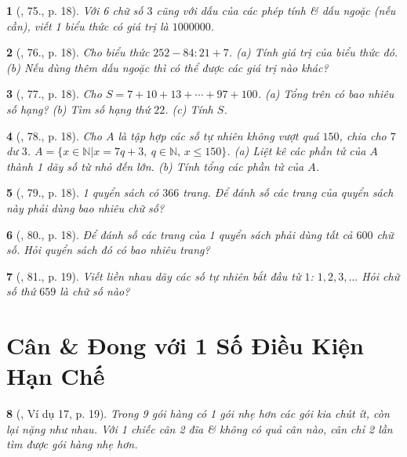 \documentclass{article}
\newtheorem{baitoan}{}
\begin{document}
\begin{baitoan}[\cite{Tuyen_Toan_6}, 75., p. 18]
	Với 6 chữ số $3$ cũng với dấu của các phép tính \& dấu ngoặc (nếu cần), viết 1 biểu thức có giá trị là $1000000$.
\end{baitoan}

\begin{baitoan}[\cite{Tuyen_Toan_6}, 76., p. 18]
	Cho biểu thức $252 - 84:21 + 7$. (a) Tính giá trị của biểu thức đó. (b) Nếu dùng thêm dấu ngoặc thì có thể được các giá trị nào khác?
\end{baitoan}

\begin{baitoan}[\cite{Tuyen_Toan_6}, 77., p. 18]
	Cho $S = 7 + 10 + 13 + \cdots + 97 + 100$. (a) Tổng trên có bao nhiêu số hạng? (b) Tìm số hạng thứ $22$. (c) Tính $S$.
\end{baitoan}

\begin{baitoan}[\cite{Tuyen_Toan_6}, 78., p. 18]
	Cho $A$ là tập hợp các số tự nhiên không vượt quá $150$, chia cho $7$ dư $3$. $A = \{x\in\mathbb{N}|x = 7q + 3,\ q\in\mathbb{N},\,x\le150\}$. (a) Liệt kê các phần tử của $A$ thành 1 dãy số từ nhỏ đến lớn. (b) Tính tổng các phần tử của $A$.
\end{baitoan}

\begin{baitoan}[\cite{Tuyen_Toan_6}, 79., p. 18]
	1 quyển sách có $366$ trang. Để đánh số các trang của quyển sách này phải dùng bao nhiêu chữ số?
\end{baitoan}

\begin{baitoan}[\cite{Tuyen_Toan_6}, 80., p. 18]
	Để đánh số các trang của 1 quyển sách phải dùng tất cả $600$ chữ số. Hỏi quyển sách đó có bao nhiêu trang?
\end{baitoan}

\begin{baitoan}[\cite{Tuyen_Toan_6}, 81., p. 19]
	Viết liền nhau dãy các số tự nhiên bắt đầu từ $1$: $1,2,3,\ldots$ Hỏi chữ số thứ $659$ là chữ số nào?
\end{baitoan}


\section{Cân \& Đong với 1 Số Điều Kiện Hạn Chế}

\begin{baitoan}[\cite{Tuyen_Toan_6}, Ví dụ 17, p. 19]
	Trong 9 gói hàng có 1 gói nhẹ hơn các gói kia chút ít, còn lại nặng như nhau. Với 1 chiếc cân 2 đĩa \& không có quả cân nào, cân chỉ 2 lần tìm được gói hàng nhẹ hơn.
\end{baitoan}
\end{document}
